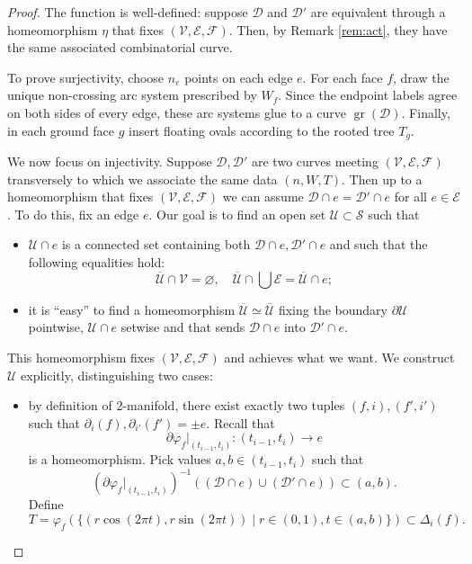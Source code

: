 \documentclass[10pt,a4paper]{amsart}
\newcommand*{\calD}{\mathcal{D}}
\newcommand*{\calE}{\mathcal{E}}
\newcommand*{\calF}{\mathcal{F}}
\newcommand*{\calS}{\mathcal{S}}
\newcommand*{\calU}{\mathcal{U}}
\newcommand*{\calV}{\mathcal{V}}
\DeclareMathOperator{\gr}{gr}
\begin{document}
\begin{proof}
    The function is well-defined: suppose $\calD$ and $\calD'$ are equivalent through a homeomorphism $\eta$ that fixes $(\calV,\calE,\calF)$. Then, by Remark \ref{rem:act}, they have the same associated combinatorial curve.

    To prove surjectivity, choose $n_e$ points on each edge $e$. For each face $f$, draw the unique non-crossing arc system prescribed by $W_f$. Since the endpoint labels agree on both sides of every edge, these arc systems glue to a curve $\gr(\calD)$. Finally, in each ground face $g$ insert floating ovals according to the rooted tree $T_g$.

    We now focus on injectivity. Suppose $\calD,\calD'$ are two curves meeting $(\calV,\calE,\calF)$ transversely to which we associate the same data $(n,W,T)$. Then up to a homeomorphism that fixes $(\calV,\calE,\calF)$ we can assume $\calD\cap e=\calD'\cap e$ for all $e\in\calE$. To do this, fix an edge $e$. Our goal is to find an open set $\calU\subset\calS$ such that
    \begin{itemize}
        \item $\calU\cap e$ is a connected set containing both $\calD\cap e,\calD'\cap e$ and such that the following equalities hold:
        \begin{equation}\label{eq:closureU}
            \overline{\calU}\cap\calV=\varnothing,\quad\overline{\calU}\cap\bigcup\calE=\overline{\calU}\cap e;
        \end{equation}
        \item it is ``easy'' to find a homeomorphism $\overline{\calU}\simeq\overline{\calU}$ fixing the boundary $\partial\calU$ pointwise, $\calU\cap e$ setwise and that sends $\calD\cap e$ into $\calD'\cap e$.
    \end{itemize}
    This homeomorphism fixes $(\calV,\calE,\calF)$ and achieves what we want. We construct $\calU$ explicitly, distinguishing two cases:
    \begin{itemize}
        \item[$\underline{e\not\subset\partial\calS}$:] by definition of 2-manifold, there exist exactly two tuples $(f,i),(f',i')$ such that $\partial_i(f),\partial_{i'}(f')=\pm e$. Recall that
        \[\partial\varphi_f|_{(t_{i-1},t_i)}\colon(t_{i-1},t_i)\to e\]
        is a homeomorphism. Pick values $a,b\in(t_{i-1},t_i)$ such that \[(\partial\varphi_f|_{(t_{i-1},t_i)})^{-1}((\calD\cap e)\cup(\calD'\cap e))\subset(a,b).\]
        Define
        \[T=\varphi_f(\{(r\cos(2\pi t),r\sin(2\pi t))\mid r\in(0,1),t\in(a,b)\})\subset\Delta_i(f).\]

\end{itemize}
\end{proof}
\end{document}
